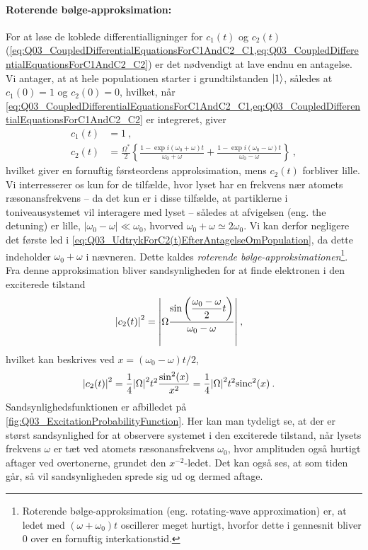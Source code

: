 \paragraph{Roterende bølge-approksimation:} For at løse de koblede differentialligninger for $c_1(t)$ og $c_2(t)$ (\cref{eq:Q03_CoupledDifferentialEquationsForC1AndC2_C1,eq:Q03_CoupledDifferentialEquationsForC1AndC2_C2}) er det nødvendigt at lave endnu en antagelse. Vi antager, at at hele populationen starter i grundtilstanden $\ket{1}$, således at $c_1(0) = 1$ og $c_2(0) = 0$, hvilket, når \cref{eq:Q03_CoupledDifferentialEquationsForC1AndC2_C1,eq:Q03_CoupledDifferentialEquationsForC1AndC2_C2} er integreret, giver
\begin{align}
    c_1(t) &= 1 \: , \label{eq:Q03_UdtrykForC1(t)EfterAntagelseOmPopulation}\\
    c_2(t) &= \frac{\Omega^*}{2} \left\{\frac{1 - \exp{i(\omega_0 + \omega)t}}{\omega_0 + \omega} + \frac{1 - \exp{i(\omega_0 - \omega)t}}{\omega_0 - \omega}\right\} \: , \label{eq:Q03_UdtrykForC2(t)EfterAntagelseOmPopulation}
\end{align}
hvilket giver en fornuftig førsteordens approksimation, mens $c_2(t)$ forbliver lille. Vi interresserer os kun for de tilfælde, hvor lyset har en frekvens nær atomets ræsonansfrekvens -- da det kun er i disse tilfælde, at partiklerne i toniveausystemet vil interagere med lyset -- således at afvigelsen (eng. the detuning) er lille, $|\omega_0 - \omega| \ll \omega_0$, hvorved $\omega_0 + \omega \simeq 2\omega_0$. Vi kan derfor negligere det første led i \cref{eq:Q03_UdtrykForC2(t)EfterAntagelseOmPopulation}, da dette indeholder $\omega_0 + \omega$ i nævneren. Dette kaldes \emph{roterende bølge-approksimationen}\footnote{Roterende bølge-approksimation (eng. rotating-wave approximation) er, at ledet med $(\omega + \omega_0)t$ oscillerer meget hurtigt, hvorfor dette i gennesnit bliver $0$ over en fornuftig interkationstid.}. Fra denne approksimation bliver sandsynligheden for at finde elektronen i den exciterede tilstand
\begin{align}
    \abs{c_2(t)}^2 &= \abs{\Omega \dfrac{\sin\left(\dfrac{\omega_0 - \omega}{2}t\right)}{\omega_0 - \omega}} \: ,
\end{align}
hvilket kan beskrives ved $x = (\omega_0 - \omega)t/2$,
\begin{align} \label{eq:Q03_ExcitationProbabilityFunction}
    \abs{c_2(t)}^2 &= \frac{1}{4}\abs{\Omega}^2t^2\frac{\sin^2(x)}{x^2} = \frac{1}{4}\abs{\Omega}^2t^2\mathrm{sinc}^2(x) \: .
\end{align}
Sandsynlighedsfunktionen er afbilledet på \cref{fig:Q03_ExcitationProbabilityFunction}. Her kan man tydeligt se, at der er størst sandsynlighed for at observere systemet i den exciterede tilstand, når lysets frekvens $\omega$ er tæt ved atomets ræsonansfrekvens $\omega_0$, hvor amplituden også hurtigt aftager ved overtonerne, grundet den $x^{-2}$-ledet. Det kan også ses, at som tiden går, så vil sandsynligheden sprede sig ud og dermed aftage.

